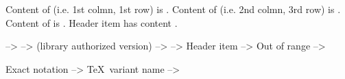 \usemodule[annotation]



\resultCommand
  {}


\setupcolor[x11]

\def\typeexampleandresult[#1]#2{

\blank[2*big]

{\em For example following source code:}

\startframedtext[width=\textwidth, frame=on, align=yes, background=color, backgroundcolor=lightgray]
{
\switchtobodyfont[#2]
\typebuffer[#1]
}
\stopframedtext

\blank[big]

{\em \dots\ produces the following output result:}

\blank[big]

\getbuffer[#1]

}


\usemodule[handlecsv]

\setheader %
\setsep{,} %

\startresult
Content of \type{\csvcell[1,1]} (i.e. 1st colmn, 1st row) is {\bf \csvcell[1,1]}. \crlf
Content of \type{\csvcell[2,3]} (i.e. 2nd colmn, 3rd row) is {\bf \csvcell[2,3]}. \crlf
Content of \type{\csvcell[9,5]} is {\bf \csvcell[9,5]}. \crlf
Header item \type{\csvcell[3,0]} has content {\ttbf \csvcell[3,0]}.
\stopresult 
\stopbuffer




\startresult
\type{\csvcell['A',1]} --> {\bf \csvcell['A',1]} \crlf
\type{\csvcell['cA',1]} --> {\bf \csvcell['cA',1]} (library authorized version)\crlf
\type{\csvcell['B',3]}  --> {\bf \csvcell['B',3]} \crlf
\type{\csvcell['cI',5]} --> {\bf \csvcell['cI',5]} \crlf
Header item \type{\csvcell['J',0]} --> {\bf \csvcell['J',0]} \crlf
Out of range \type{\csvcell['Q',157]} --> {\bf \csvcell['Q',157]}
\stopresult
\stopbuffer




\startresult
Exact notation  --> {\bf {}} \crlf
\TeX\ variant name \type{\csvcell['firstxname',1]} --> {\bf \csvcell['firstxname',1]} \crlf
\stopresult
\stopbuffer




